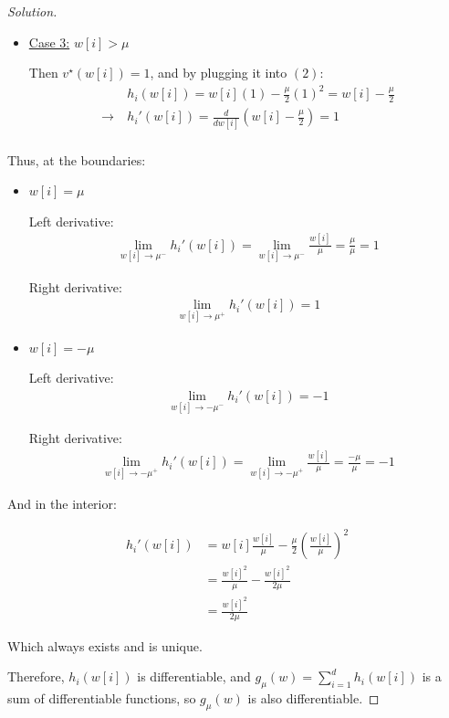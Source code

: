\documentclass{article}
\newenvironment{solution}
  {\renewcommand\qedsymbol{$\blacksquare$}\begin{proof}[Solution]}
  {\end{proof}}
\begin{document}
\begin{solution}
\begin{itemize}
        \item \underline{Case 3:} $w[i] > \mu$
        \bigskip

        Then $v^\star(w[i]) = 1$, and by plugging it into $(2)$:
        \begin{align*}
            &h_i(w[i]) = w[i] (1) - \frac{\mu}{2} (1)^2 = w[i] - \frac{\mu}{2} \\
            \rightarrow \ & h_i'(w[i]) = \frac{d}{dw[i]} \left( w[i] - \frac{\mu}{2} \right) = 1 \\
        \end{align*}
    \end{itemize}

    Thus, at the boundaries:

    \begin{itemize}
        \item $w[i] = \mu$
        \bigskip

        Left derivative:
        \begin{align*}
            \lim_{w[i] \to \mu^-} h_i'(w[i]) = \lim_{w[i] \to \mu^-} \frac{w[i]}{\mu} = \frac{\mu}{\mu} = 1
        \end{align*}

        Right derivative:
        \begin{align*}
            \lim_{w[i] \to \mu^+} h_i'(w[i]) = 1
        \end{align*}

        \item $w[i] = - \mu$
        \bigskip

        Left derivative:
        \begin{align*}
            \lim_{w[i] \to - \mu^-} h_i'(w[i]) = -1
        \end{align*}

        Right derivative:
        \begin{align*}
            \lim_{w[i] \to - \mu^+} h_i'(w[i]) = \lim_{w[i] \to - \mu^+} \frac{w[i]}{\mu} = \frac{- \mu}{\mu} = -1
        \end{align*}
    \end{itemize}

    And in the interior:

    \begin{align*}
        h_i'(w[i]) 
        &= w[i] \frac{w[i]}{\mu} - \frac{\mu}{2} \left(\frac{w[i]}{\mu}\right)^2 \\
        &= \frac{w[i]^2}{\mu} - \frac{w[i]^2}{2\mu} \\
        &= \frac{w[i]^2}{2\mu}
    \end{align*}

    Which always exists and is unique.
    \bigskip

    Therefore, $h_i(w[i])$ is differentiable, and $g_\mu(w) = \sum_{i=1}^d h_i(w[i])$ is a sum of differentiable functions, 
    so $g_\mu(w)$ is also differentiable.
    
\end{solution}
\end{document}
